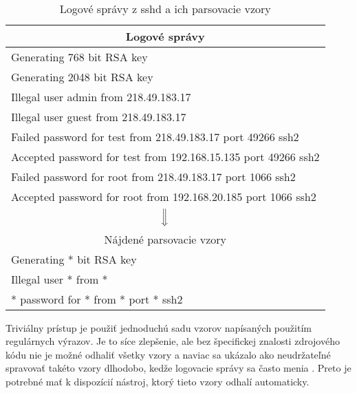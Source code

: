 \begin{table}[htbp]
\centering
\begin{tabularx}{\textwidth}{X}
\multicolumn{1}{c}{Logové správy}                                                                 \\ \hline
Generating 768 bit RSA key                                     \\
Generating 2048 bit RSA key                                    \\
Illegal user admin from 218.49.183.17                          \\
Illegal user guest from 218.49.183.17                          \\
Failed password for test from 218.49.183.17 port 49266 ssh2    \\
Accepted password for test from 192.168.15.135 port 49266 ssh2 \\
Failed password for root from 218.49.183.17 port 1066 ssh2     \\
Accepted password for root from 192.168.20.185 port 1066 ssh2  \\
\multicolumn{1}{c}{\multirow{2}{*}{ $\Big\Downarrow$ }}                                                             \\
\multicolumn{1}{c}{}                                                                              \\
\multicolumn{1}{c}{Nájdené parsovacie vzory}                                                      \\ \hline
Generating * bit RSA key                                      \\
Illegal user * from *                                          \\
* password for * from * port * ssh2                           
\end{tabularx}
\caption{Logové správy z sshd a ich parsovacie vzory}
\label{tab:a}
\end{table}

\par Triviálny prístup je použiť jednoduchú sadu vzorov napísaných použitím regulárnych výrazov. Je to síce zlepšenie, ale bez špecifickej znalosti zdrojového kódu nie je možné odhaliť všetky vzory a naviac sa ukázalo ako neudržateľné spravovať takéto vzory dlhodobo, kedže logovacie správy sa často menia \parencite{xu2010}. Preto je potrebné mať k dispozícií nástroj, ktorý tieto vzory odhalí automaticky.








